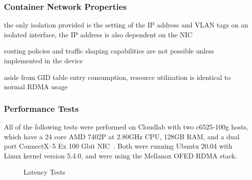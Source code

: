 \documentclass[12pt,titlepage]{article}
\begin{document}
\subsubsection*{Container Network Properties}
\begin{description}[nolistsep,font={{\scshape\bfseries}}]
	\item[Network Isolation] the only isolation provided is the setting of the IP address and VLAN tags on an isolated interface, the IP address is also dependent on the NIC
	\item[Controllability] routing policies and traffic shaping capabilities are not possible unless implemented in the device
	\item[Resource Utilization] aside from GID table entry consumption, resource utilization is identical to normal RDMA usage
\end{description}

\subsubsection*{Performance Tests}
All of the following tests were performed on Cloudlab with two c6525-100g hosts, which have a 24 core AMD 7402P at 2.80GHz CPU, 128GB RAM, and a dual port ConnectX--5 Ex 100 Gbit NIC~\cite{cloudlab}. 
Both were running Ubuntu 20.04 with Linux kernel version 5.4.0, and were using the Mellanox OFED RDMA stack.

\begin{figure}
	\centering
	\caption{Latency Tests}%
	\label{fig:shared_hca_latency}
\end{figure}
\end{document}
